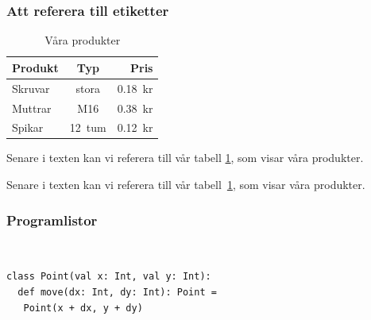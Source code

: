 \begin{frame}[fragile,t]
  \frametitle{Att referera till etiketter}
  \vspace{1em}



  \begin{exlatex}
\begin{table}
  \begin{tabular}{lcr}
    Produkt & Typ    & Pris    \\
    \hline
    Skruvar & stora  & 0.18~kr \\
    Muttrar & M16    & 0.38~kr \\
    Spikar  & 12~tum & 0.12~kr
  \end{tabular}
  \caption{Våra produkter}
  \label{produkter}
\end{table}
Senare i texten kan vi referera till vår tabell \ref{produkter}, som visar våra produkter.

Senare i texten kan vi referera till vår tabell~\ref{produkter}, som visar våra produkter.
  \end{exlatex}

\end{frame}

\begin{frame}[fragile,t]
  \frametitle{Programlistor}\SlideFontSmall
  \vspace{.5em}

  \begin{itemize}
  \end{itemize}

  \halfblankline
\begin{exlatex}
\usepackage{fancyvrb}
\end{exlatex}

~\vspace{1em}

\begin{exlatex}

{\small
\begin{verbatim}
class Point(val x: Int, val y: Int):
  def move(dx: Int, dy: Int): Point = 
   Point(x + dx, y + dy)

\end{verbatim}
}  
\end{exlatex}

\end{frame}

